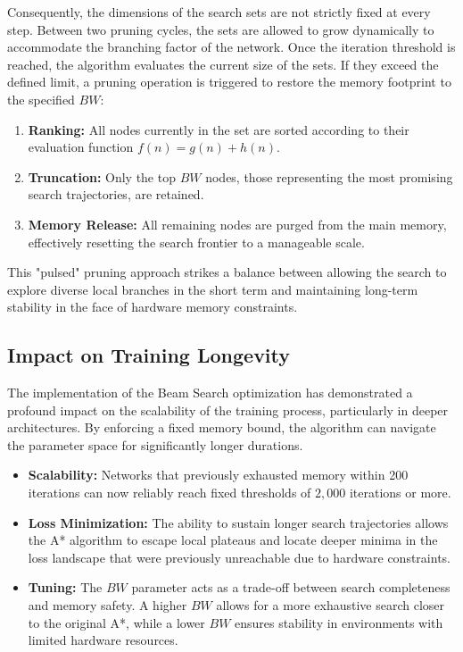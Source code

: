 Consequently, the dimensions of the search sets are not strictly fixed at every step. Between two pruning cycles, the sets are allowed to grow dynamically to accommodate the branching factor of the network. Once the iteration threshold is reached, the algorithm evaluates the current size of the sets. If they exceed the defined limit, a pruning operation is triggered to restore the memory footprint to the specified $BW$:

\begin{enumerate}
    \item \textbf{Ranking:} All nodes currently in the set are sorted according to their evaluation function $f(n) = g(n) + h(n)$.
    \item \textbf{Truncation:} Only the top $BW$ nodes, those representing the most promising search trajectories, are retained.
    \item \textbf{Memory Release:} All remaining nodes are purged from the main memory, effectively resetting the search frontier to a manageable scale.
\end{enumerate}

This "pulsed" pruning approach strikes a balance between allowing the search to explore diverse local branches in the short term and maintaining long-term stability in the face of hardware memory constraints.

\subsection{Impact on Training Longevity}
The implementation of the Beam Search optimization has demonstrated a profound impact on the scalability of the training process, particularly in deeper architectures. By enforcing a fixed memory bound, the algorithm can navigate the parameter space for significantly longer durations. 

\begin{itemize}
    \item \textbf{Scalability:} Networks that previously exhausted memory within 200 iterations can now reliably reach fixed thresholds of $2,000$ iterations or more.
    \item \textbf{Loss Minimization:} The ability to sustain longer search trajectories allows the A* algorithm to escape local plateaus and locate deeper minima in the loss landscape that were previously unreachable due to hardware constraints.
    \item \textbf{Tuning:} The $BW$ parameter acts as a trade-off between search completeness and memory safety. A higher $BW$ allows for a more exhaustive search closer to the original A*, while a lower $BW$ ensures stability in environments with limited hardware resources.
\end{itemize}

